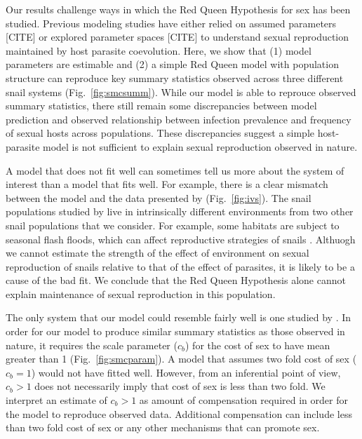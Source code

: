 \documentclass{article}\usepackage[]{graphicx}\usepackage[]{color}
\newcommand{\fref}[1]{Fig.~\ref{fig:#1}}
\begin{document}
Our results challenge ways in which the Red Queen Hypothesis for sex has been studied.
Previous modeling studies have either relied on assumed parameters [CITE] or explored parameter spaces [CITE]
to understand sexual reproduction maintained by host parasite coevolution.
Here, we show that (1) model parameters are estimable and (2) a simple Red Queen model with population structure can reproduce key summary statistics observed across three different snail systems (\fref{smcsumm}).
While our model is able to reprouce observed summary statistics, there still remain some discrepancies between model prediction and observed relationship between infection prevalence and frequency of sexual hosts across populations.
These discrepancies suggest a simple host-parasite model is not sufficient to explain sexual reproduction observed in nature.

A model that does not fit well can sometimes tell us more about the system of interest than a model that fits well.
For example, there is a clear mismatch between the model and the data presented by \cite{dagan2013clonal} (\fref{ivs}).
The snail populations studied by \cite{dagan2013clonal} live in intrinsically different environments from two other snail populations that we consider.
For example, some habitats are subject to seasonal flash floods, which can affect reproductive strategies of snails \citep{ben2007temporal}.
Althuogh we cannot estimate the strength of the effect of environment on sexual reproduction of snails relative to that of the effect of parasites, it is likely to be a cause of the bad fit.
We conclude that the Red Queen Hypothesis alone cannot explain maintenance of sexual reproduction in this population.

The only system that our model could resemble fairly well is one studied by \cite{vergara2014infection}.
In order for our model to produce similar summary statistics as those observed in nature, it requires the scale parameter ($c_b$) for the cost of sex to have mean greater than 1 (\fref{smcparam}).
A model that assumes two fold cost of sex ($c_b=1$) would not have fitted well.
However, from an inferential point of view, $c_b > 1$ does not necessarily imply that cost of sex is less than two fold.
We interpret an estimate of $c_b > 1$ as amount of compensation required in order for the model to reproduce observed data.
Additional compensation can include less than two fold cost of sex or any other mechanisms that can promote sex.
\end{document}
